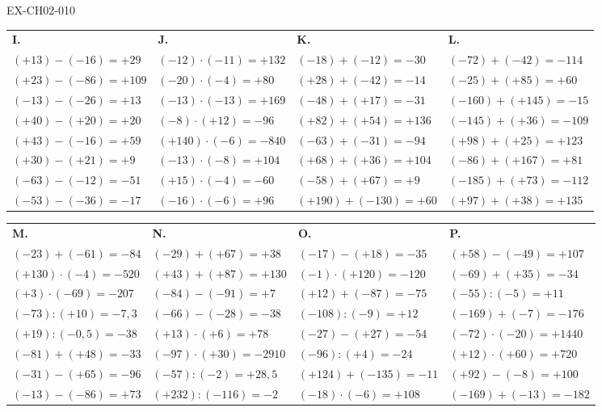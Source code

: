 \documentclass[12pt, a4paper]{article}
\begin{document}
\begin{solution}{EX-CH02-010}
\bigskip
\begin{tabularx}{\linewidth}{*{4}{X}}
\textbf{I.} & \textbf{J.} & \textbf{K.} & \textbf{L.} \\
$(+13)-(-16)=+29$ & $(-12)\cdot(-11)=+132$ & $(-18)+(-12)=-30$ & $(-72)+(-42)=-114$ \\
$(+23)-(-86)=+109$ & $(-20)\cdot(-4)=+80$ & $(+28)+(-42)=-14$ & $(-25)+(+85)=+60$ \\
$(-13)-(-26)=+13$ & $(-13)\cdot(-13)=+169$ & $(-48)+(+17)=-31$ & $(-160)+(+145)=-15$ \\
$(+40)-(+20)=+20$ & $(-8)\cdot(+12)=-96$ & $(+82)+(+54)=+136$ & $(-145)+(+36)=-109$ \\
$(+43)-(-16)=+59$ & $(+140)\cdot(-6)=-840$ & $(-63)+(-31)=-94$ & $(+98)+(+25)=+123$ \\
$(+30)-(+21)=+9$ & $(-13)\cdot(-8)=+104$ & $(+68)+(+36)=+104$ & $(-86)+(+167)=+81$ \\
$(-63)-(-12)=-51$ & $(+15)\cdot(-4)=-60$ & $(-58)+(+67)=+9$ & $(-185)+(+73)=-112$ \\
$(-53)-(-36)=-17$ & $(-16)\cdot(-6)=+96$ & $(+190)+(-130)=+60$ & $(+97)+(+38)=+135$ \\
\end{tabularx}

\bigskip
\begin{tabularx}{\linewidth}{*{4}{X}}
\textbf{M.} & \textbf{N.} & \textbf{O.} & \textbf{P.} \\
$(-23)+(-61)=-84$ & $(-29)+(+67)=+38$ & $(-17)-(+18)=-35$ & $(+58)-(-49)=+107$ \\
$(+130)\cdot(-4)=-520$ & $(+43)+(+87)=+130$ & $(-1)\cdot(+120)=-120$ & $(-69)+(+35)=-34$ \\
$(+3)\cdot(-69)=-207$ & $(-84)-(-91)=+7$ & $(+12)+(-87)=-75$ & $(-55):(-5)=+11$ \\
$(-73):(+10)=-7{,}3$ & $(-66)-(-28)=-38$ & $(-108):(-9)=+12$ & $(-169)+(-7)=-176$ \\
$(+19):(-0{,}5)=-38$ & $(+13)\cdot(+6)=+78$ & $(-27)-(+27)=-54$ & $(-72)\cdot(-20)=+1440$ \\
$(-81)+(+48)=-33$ & $(-97)\cdot(+30)=-2910$ & $(-96):(+4)=-24$ & $(+12)\cdot(+60)=+720$ \\
$(-31)-(+65)=-96$ & $(-57):(-2)=+28{,}5$ & $(+124)+(-135)=-11$ & $(+92)-(-8)=+100$ \\
$(-13)-(-86)=+73$ & $(+232):(-116)=-2$ & $(-18)\cdot(-6)=+108$ & $(-169)+(-13)=-182$ \\
\end{tabularx}

\end{solution}
\end{document}
